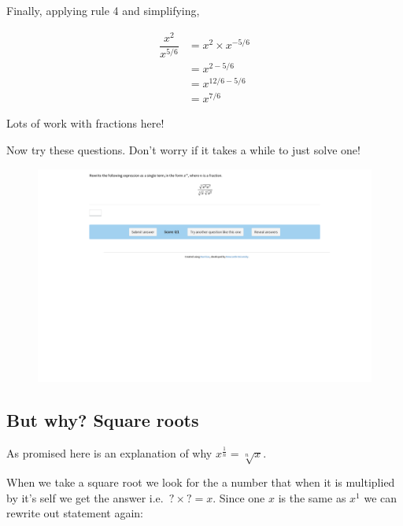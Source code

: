 \documentclass[
  a4paper,
]{scrbook}
\begin{document}
Finally, applying rule 4 and simplifying,

\[
\begin{aligned} \dfrac{x^2}{x^{5/6}} &=x^2 \times x^{-5/6} \\
 &= x^{2-5/6} \\
 &= x^{12/6-5/6} \\
 &= x^{7/6}
\end{aligned}
\]

Lots of work with fractions here!

Now try these questions. Don't worry if it takes a while to just solve
one!

\begin{figure}

{\centering 

\href{https://numbas.mathcentre.ac.uk/question/64712/indices-change-of-notation-3/embed/?token=246845ab-e1ea-4745-9106-5750be81ed2c}{\includegraphics{./08-indices_files/figure-pdf/unnamed-chunk-1-1.png}}

}

\end{figure}

\hypertarget{but-why-square-roots}{%
\subsection{But why? Square roots}\label{but-why-square-roots}}

As promised here is an explanation of why
\(x^{\frac{1}{n}} = \sqrt[n]x\).

When we take a square root we look for the a number that when it is
multiplied by it's self we get the answer i.e.~\(? \times ? = x\). Since
one \(x\) is the same as \(x^1\) we can rewrite out statement again:
\end{document}
